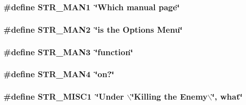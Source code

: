 \label{F__SPEAR_8H_a7dd3e220239424b42dd332e203a1e127}
\hypertarget{F__SPEAR_8H_a9aa8488d922681c3505d651155eeba6e}{
\subsubsection[{STR\_\-MAN1}]{\setlength{\rightskip}{0pt plus 5cm}\#define STR\_\-MAN1~\char`\"{}Which manual page\char`\"{}}}
\label{F__SPEAR_8H_a9aa8488d922681c3505d651155eeba6e}
\hypertarget{F__SPEAR_8H_a94b9e508d3cf324895cd52c448de24ea}{
\subsubsection[{STR\_\-MAN2}]{\setlength{\rightskip}{0pt plus 5cm}\#define STR\_\-MAN2~\char`\"{}is the Options Menu\char`\"{}}}
\label{F__SPEAR_8H_a94b9e508d3cf324895cd52c448de24ea}
\hypertarget{F__SPEAR_8H_a6184d9bc6aacbc7f447a79356444446c}{
\subsubsection[{STR\_\-MAN3}]{\setlength{\rightskip}{0pt plus 5cm}\#define STR\_\-MAN3~\char`\"{}function\char`\"{}}}
\label{F__SPEAR_8H_a6184d9bc6aacbc7f447a79356444446c}
\hypertarget{F__SPEAR_8H_a595a83a96a13036040148c4eb1044897}{
\subsubsection[{STR\_\-MAN4}]{\setlength{\rightskip}{0pt plus 5cm}\#define STR\_\-MAN4~\char`\"{}on?\char`\"{}}}
\label{F__SPEAR_8H_a595a83a96a13036040148c4eb1044897}
\hypertarget{F__SPEAR_8H_aa662dd23314b8fb854b40b2b23c67b2c}{
\subsubsection[{STR\_\-MISC1}]{\setlength{\rightskip}{0pt plus 5cm}\#define STR\_\-MISC1~\char`\"{}Under $\backslash$\char`\"{}Killing the Enemy$\backslash$\char`\"{}, what\char`\"{}}}
